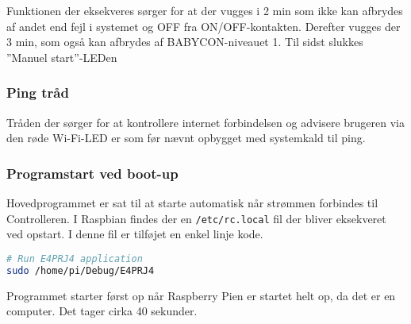 Funktionen der eksekveres sørger for at der vugges i 2 min som ikke kan afbrydes af andet end fejl i systemet og OFF fra ON/OFF-kontakten. Derefter vugges der 3 min, som også kan afbrydes af BABYCON-niveauet 1. Til sidst slukkes ''Manuel start''-LEDen


\subsubsection*{Ping tråd}

Tråden der sørger for at kontrollere internet forbindelsen og advisere brugeren via den røde Wi-Fi-LED er som før nævnt opbygget med systemkald til ping. 


\subsubsection*{Programstart ved boot-up}

Hovedprogrammet er sat til at starte automatisk når strømmen forbindes til Controlleren. I Raspbian findes der en \verb+/etc/rc.local+ fil der bliver eksekveret ved opstart. I denne fil er tilføjet en enkel linje kode.

\begin{lstlisting}[language=sh]
# Run E4PRJ4 application
sudo /home/pi/Debug/E4PRJ4
\end{lstlisting}

Programmet starter først op når Raspberry Pien er startet helt op, da det er en computer. Det tager cirka 40 sekunder.
